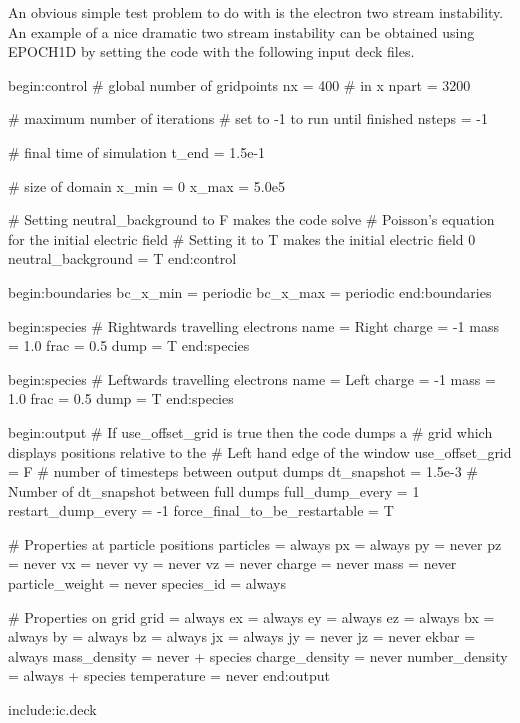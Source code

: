 \documentclass[12pt,a4paper]{article}
\newcommand{\EPOCH}{{\color{warwickdark}\fontfamily{phv}\selectfont{EPOCH}}}
\newenvironment{lboxverbatim}[1]{
\setlength{\FrameSep}{0pt}
\def\FrameCommand{\fboxsep=0pt \colorbox{shadecolor}}
\MakeFramed{\FrameRestore}
\vspace{-13.5pt}
\fvset{label=#1}
\boxverb
}{
\endboxverb
\vspace{-13.5pt}
\endMakeFramed
}
\begin{document}
An obvious simple test problem to do with {\EPOCH} is the electron two stream
instability. An example of a nice dramatic two stream instability can be
obtained using EPOCH1D by setting the code with the following input deck
files.
\begin{lboxverbatim}{input.deck}
begin:control
   # global number of gridpoints
   nx = 400 # in x
   npart = 3200

   # maximum number of iterations
   # set to -1 to run until finished
   nsteps = -1

   # final time of simulation
   t_end = 1.5e-1

   # size of domain
   x_min = 0
   x_max = 5.0e5

   # Setting neutral_background to F makes the code solve
   # Poisson's equation for the initial electric field
   # Setting it to T makes the initial electric field 0
   neutral_background = T
end:control

begin:boundaries
   bc_x_min = periodic
   bc_x_max = periodic
end:boundaries

begin:species
   # Rightwards travelling electrons
   name = Right
   charge = -1
   mass = 1.0
   frac = 0.5
   dump = T
end:species

begin:species
   # Leftwards travelling electrons
   name = Left
   charge = -1
   mass = 1.0
   frac = 0.5
   dump = T
end:species

begin:output
   # If use_offset_grid is true then the code dumps a
   # grid which displays positions relative to the
   # Left hand edge of the window
   use_offset_grid = F
   # number of timesteps between output dumps
   dt_snapshot = 1.5e-3
   # Number of dt_snapshot between full dumps
   full_dump_every = 1
   restart_dump_every = -1
   force_final_to_be_restartable = T

   # Properties at particle positions
   particles = always
   px = always
   py = never
   pz = never
   vx = never
   vy = never
   vz = never
   charge = never
   mass = never
   particle_weight = never
   species_id = always

   # Properties on grid
   grid = always
   ex = always
   ey = always
   ez = always
   bx = always
   by = always
   bz = always
   jx = always
   jy = never
   jz = never
   ekbar = always
   mass_density = never + species
   charge_density = never
   number_density = always + species
   temperature = never
end:output

include:ic.deck
\end{lboxverbatim}
\end{document}
